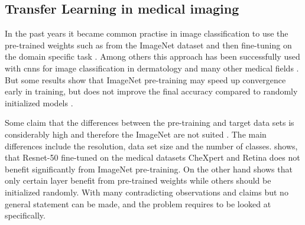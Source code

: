 \subsection{Transfer Learning in medical imaging}
In the past years it became common practise in image classification to use the pre-trained weights such as from the ImageNet dataset and then fine-tuning on the domain specific task \autocite{russakovsky2014}. 
Among others this approach has been successfully used with \glspl{cnn} for image classification in dermatology and many other medical fields \autocite{esteva2017,lam2018,bayramoglu2016,pardamean2018,yang2018}. But some results show that ImageNet pre-training may speed up convergence early in training, but does not improve the final accuracy compared to randomly initialized models \autocite{he2018}.

Some claim that the differences between the pre-training and target data sets is considerably high and therefore the ImageNet are not suited \autocite{raghu2019}.
The main differences include the resolution, data set size and the number of classes.
\autocite{raghu2019} shows, that Resnet-50 fine-tuned on the medical datasets CheXpert and Retina does not benefit significantly from ImageNet pre-training. On the other hand \autocite{raghu2019} shows that only certain layer benefit from pre-trained weights while others should be initialized randomly. With many contradicting observations and claims but no general statement can be made, and the problem requires to be looked at specifically.






